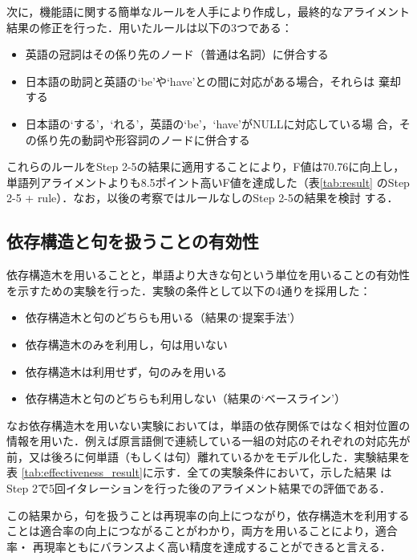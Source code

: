 \documentclass[japanese]{jnlp_1.4}
\begin{document}
次に，機能語に関する簡単なルールを人手により作成し，最終的なアライメント
結果の修正を行った．用いたルールは以下の3つである：
\begin{itemize}
 \item 英語の冠詞はその係り先のノード（普通は名詞）に併合する
 \item 日本語の助詞と英語の`be'や`have'との間に対応がある場合，それらは
       棄却する
 \item 日本語の‘する’，‘れる’，英語の`be'，`have'がNULLに対応している場
       合，その係り先の動詞や形容詞のノードに併合する
\end{itemize}
これらのルールをStep 2-5の結果に適用することにより，F値は70.76に向上し，
単語列アライメントよりも8.5ポイント高いF値を達成した（表\ref{tab:result} 
のStep 2-5 + rule）．なお，以後の考察ではルールなしのStep 2-5の結果を検討
する．




\subsection{依存構造と句を扱うことの有効性}
\label{exp2}

依存構造木を用いることと，単語より大きな句という単位を用いることの有効性
を示すための実験を行った．実験の条件として以下の4通りを採用した：
\begin{itemize}
 \item 依存構造木と句のどちらも用いる（結果の‘提案手法’）
 \item 依存構造木のみを利用し，句は用いない
 \item 依存構造木は利用せず，句のみを用いる
 \item 依存構造木と句のどちらも利用しない（結果の‘ベースライン’）
\end{itemize}
なお依存構造木を用いない実験においては，単語の依存関係ではなく相対位置の
情報を用いた．例えば原言語側で連続している一組の対応のそれぞれの対応先が
前，又は後ろに何単語（もしくは句）離れているかをモデル化した．実験結果を表
\ref{tab:effectiveness_result}に示す．全ての実験条件において，示した結果
はStep 2で5回イタレーションを行った後のアライメント結果での評価である．

\begin{table}[t]
  \label{tab:effectiveness_result}

\end{table}

この結果から，句を扱うことは再現率の向上につながり，依存構造木を利用する
ことは適合率の向上につながることがわかり，両方を用いることにより，適合率・
再現率ともにバランスよく高い精度を達成することができると言える．
\end{document}
